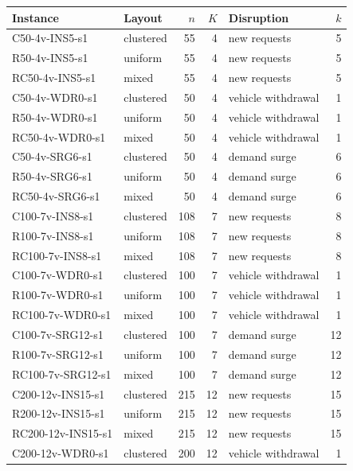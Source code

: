 \begin{tabular}{llrrlr}
\toprule
\textbf{Instance} & \textbf{Layout} & $n$ & $K$ & \textbf{Disruption} & $k$ \\
\midrule
\textsf{C50-4v-INS5-s1} & clustered & 55 & 4 & new requests & 5 \\
\textsf{R50-4v-INS5-s1} & uniform & 55 & 4 & new requests & 5 \\
\textsf{RC50-4v-INS5-s1} & mixed & 55 & 4 & new requests & 5 \\
\textsf{C50-4v-WDR0-s1} & clustered & 50 & 4 & vehicle withdrawal & 1 \\
\textsf{R50-4v-WDR0-s1} & uniform & 50 & 4 & vehicle withdrawal & 1 \\
\textsf{RC50-4v-WDR0-s1} & mixed & 50 & 4 & vehicle withdrawal & 1 \\
\textsf{C50-4v-SRG6-s1} & clustered & 50 & 4 & demand surge & 6 \\
\textsf{R50-4v-SRG6-s1} & uniform & 50 & 4 & demand surge & 6 \\
\textsf{RC50-4v-SRG6-s1} & mixed & 50 & 4 & demand surge & 6 \\
\textsf{C100-7v-INS8-s1} & clustered & 108 & 7 & new requests & 8 \\
\textsf{R100-7v-INS8-s1} & uniform & 108 & 7 & new requests & 8 \\
\textsf{RC100-7v-INS8-s1} & mixed & 108 & 7 & new requests & 8 \\
\textsf{C100-7v-WDR0-s1} & clustered & 100 & 7 & vehicle withdrawal & 1 \\
\textsf{R100-7v-WDR0-s1} & uniform & 100 & 7 & vehicle withdrawal & 1 \\
\textsf{RC100-7v-WDR0-s1} & mixed & 100 & 7 & vehicle withdrawal & 1 \\
\textsf{C100-7v-SRG12-s1} & clustered & 100 & 7 & demand surge & 12 \\
\textsf{R100-7v-SRG12-s1} & uniform & 100 & 7 & demand surge & 12 \\
\textsf{RC100-7v-SRG12-s1} & mixed & 100 & 7 & demand surge & 12 \\
\textsf{C200-12v-INS15-s1} & clustered & 215 & 12 & new requests & 15 \\
\textsf{R200-12v-INS15-s1} & uniform & 215 & 12 & new requests & 15 \\
\textsf{RC200-12v-INS15-s1} & mixed & 215 & 12 & new requests & 15 \\
\textsf{C200-12v-WDR0-s1} & clustered & 200 & 12 & vehicle withdrawal & 1 \\

\end{tabular}
